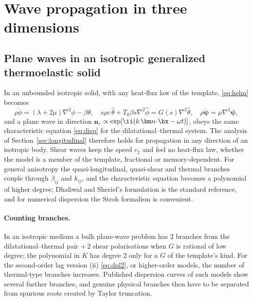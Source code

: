 \section{Wave propagation in three dimensions}\label{sec:waves3d}
\subsection{Plane waves in an isotropic generalized thermoelastic solid}
In an unbounded isotropic solid, with any heat-flux law of the template, \eqref{eq:helm} becomes
\begin{equation}
\rho\ddot\phi=(\lambda+2\mu)\nabla^2\phi-\beta\theta,\quad
s\rho c\,\hat\theta+T_0\beta s\nabla^2\hat\phi=G(s)\nabla^2\hat\theta,\quad
\rho\ddot{\bm\psi}=\mu\nabla^2\bm\psi,
\end{equation}
and a plane wave in direction $\bm n$, $\propto\exp[\ii(k\,\bm n\!\cdot\!\bx-\omega t)]$, obeys the same characteristic equation \eqref{eq:disp} for the dilatational--thermal system. The analysis of Section~\ref{sec:longitudinal} therefore holds for propagation in any direction of an isotropic body. Shear waves keep the speed $c_2$ and feel no heat-flux law, whether the model is a member of the template, fractional or memory-dependent. For general anisotropy the quasi-longitudinal, quasi-shear and thermal branches couple through $\beta_{ij}$ and $k_{ij}$, and the characteristic equation becomes a polynomial of higher degree; Dhaliwal and Sherief's formulation \citep{Dhaliwal1980} is the standard reference, and for numerical dispersion the Stroh formalism \citep{Stroh1958,Stroh1962} is convenient.

\paragraph{Counting branches.} In an isotropic medium a bulk plane-wave problem has $2$ branches from the dilatational--thermal pair $+\,2$ shear polarisations when $G$ is rational of low degree; the polynomial in $K$ has degree $2$ only for a $G$ of the template's kind. For the second-order lag version (ii) \eqref{eq:dpl2}, or higher-order models, the number of thermal-type branches increases. Published dispersion curves of such models show several further branches, and genuine physical branches then have to be separated from spurious roots created by Taylor truncation.

